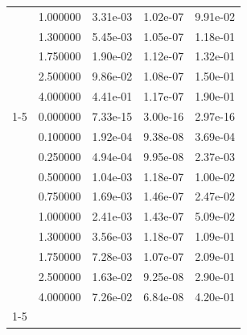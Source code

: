 \begin{tabular}{llrrr}
 & 1.000000 & 3.31e-03 & 1.02e-07 & 9.91e-02 \\
 & 1.300000 & 5.45e-03 & 1.05e-07 & 1.18e-01 \\
 & 1.750000 & 1.90e-02 & 1.12e-07 & 1.32e-01 \\
 & 2.500000 & 9.86e-02 & 1.08e-07 & 1.50e-01 \\
 & 4.000000 & 4.41e-01 & 1.17e-07 & 1.90e-01 \\
\cline{1-5}
\multirow[t]{10}{*}{tree} & 0.000000 & 7.33e-15 & 3.00e-16 & 2.97e-16 \\
 & 0.100000 & 1.92e-04 & 9.38e-08 & 3.69e-04 \\
 & 0.250000 & 4.94e-04 & 9.95e-08 & 2.37e-03 \\
 & 0.500000 & 1.04e-03 & 1.18e-07 & 1.00e-02 \\
 & 0.750000 & 1.69e-03 & 1.46e-07 & 2.47e-02 \\
 & 1.000000 & 2.41e-03 & 1.43e-07 & 5.09e-02 \\
 & 1.300000 & 3.56e-03 & 1.18e-07 & 1.09e-01 \\
 & 1.750000 & 7.28e-03 & 1.07e-07 & 2.09e-01 \\
 & 2.500000 & 1.63e-02 & 9.25e-08 & 2.90e-01 \\
 & 4.000000 & 7.26e-02 & 6.84e-08 & 4.20e-01 \\
\cline{1-5}
\bottomrule
\end{tabular}
